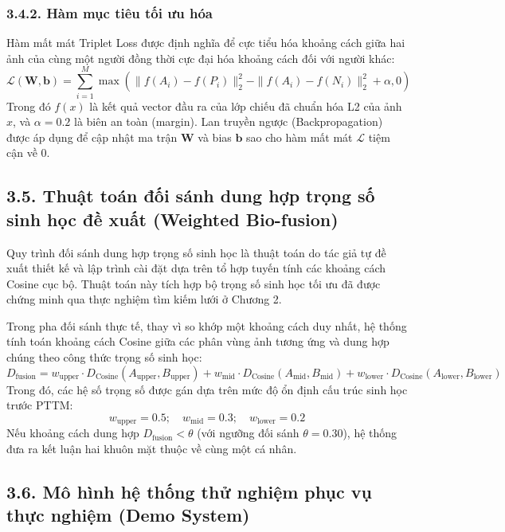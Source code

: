 \subsubsection*{3.4.2. Hàm mục tiêu tối ưu hóa}
Hàm mất mát Triplet Loss được định nghĩa để cực tiểu hóa khoảng cách giữa hai ảnh của cùng một người đồng thời cực đại hóa khoảng cách đối với người khác:
$$\mathcal{L}(\bm{W}, \bm{b}) = \sum_{i=1}^{M} \max \left( \|f(A_i) - f(P_i)\|_2^2 - \|f(A_i) - f(N_i)\|_2^2 + \alpha, 0 \right)$$
Trong đó $f(x)$ là kết quả vector đầu ra của lớp chiếu đã chuẩn hóa L2 của ảnh $x$, và $\alpha = 0.2$ là biên an toàn (margin). Lan truyền ngược (Backpropagation) được áp dụng để cập nhật ma trận $\bm{W}$ và bias $\bm{b}$ sao cho hàm mất mát $\mathcal{L}$ tiệm cận về 0.

\subsection*{3.5. Thuật toán đối sánh dung hợp trọng số sinh học đề xuất (Weighted Bio-fusion)}

Quy trình đối sánh dung hợp trọng số sinh học là thuật toán do tác giả tự đề xuất thiết kế và lập trình cài đặt dựa trên tổ hợp tuyến tính các khoảng cách Cosine cục bộ. Thuật toán này tích hợp bộ trọng số sinh học tối ưu đã được chứng minh qua thực nghiệm tìm kiếm lưới ở Chương 2.

Trong pha đối sánh thực tế, thay vì so khớp một khoảng cách duy nhất, hệ thống tính toán khoảng cách Cosine giữa các phân vùng ảnh tương ứng và dung hợp chúng theo công thức trọng số sinh học:
$$D_{\text{fusion}} = w_{\text{upper}} \cdot D_{\text{Cosine}}(A_{\text{upper}}, B_{\text{upper}}) + w_{\text{mid}} \cdot D_{\text{Cosine}}(A_{\text{mid}}, B_{\text{mid}}) + w_{\text{lower}} \cdot D_{\text{Cosine}}(A_{\text{lower}}, B_{\text{lower}})$$
Trong đó, các hệ số trọng số được gán dựa trên mức độ ổn định cấu trúc sinh học trước PTTM:
$$w_{\text{upper}} = 0.5; \quad w_{\text{mid}} = 0.3; \quad w_{\text{lower}} = 0.2$$
Nếu khoảng cách dung hợp $D_{\text{fusion}} < \theta$ (với ngưỡng đối sánh $\theta = 0.30$), hệ thống đưa ra kết luận hai khuôn mặt thuộc về cùng một cá nhân.

\subsection*{3.6. Mô hình hệ thống thử nghiệm phục vụ thực nghiệm (Demo System)}

